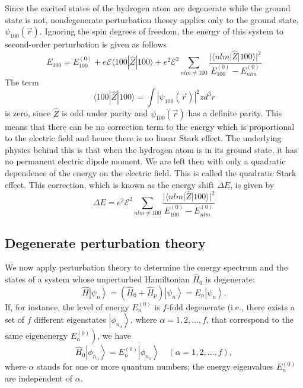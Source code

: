 Since the excited states of the hydrogen atom are degenerate while the ground state is not, nondegenerate perturbation theory applies only to the ground state, $\psi_{100}(\vec{r})$. Ignoring the spin degrees of freedom, the energy of this system to second-order perturbation is given as follows
$$
E_{100}=E_{100}^{(0)}+e \mathcal{E}\langle 100|\hat{Z}| 100\rangle+e^{2} \mathcal{E}^{2} \sum_{n l m \neq 100} \frac{|\langle n l m|\hat{Z}| 100\rangle|^{2}}{E_{100}^{(0)}-E_{n l m}^{(0)}}
$$
The term
$$
\langle 100|\hat{Z}| 100\rangle=\int\left|\psi_{100}(\vec{r})\right|^{2} z d^{3} r
$$
is zero, since $\hat{Z}$ is odd under parity and $\psi_{100}(\vec{r})$ has a definite parity. This means that there can be no correction term to the energy which is proportional to the electric field and hence there is no linear Stark effect. The underlying physics behind this is that when the hydrogen atom is in its ground state, it has no permanent electric dipole moment. We are left then with only a quadratic dependence of the energy  on the electric field. This is called the quadratic Stark effect. This correction, which is known as the energy shift $\Delta E$, is given by
$$
\Delta E=e^{2} \mathcal{E}^{2} \sum_{n l m \neq 100} \frac{|\langle n l m|\hat{Z}| 100\rangle|^{2}}{E_{100}^{(0)}-E_{n l m}^{(0)}}
$$
\subsection{Degenerate perturbation theory}
 We now apply perturbation theory to determine the energy spectrum and the states of a system whose unperturbed Hamiltonian $\hat{H}_{0}$ is degenerate:
$$
\hat{H}\left|\psi_{n}\right\rangle=\left(\hat{H}_{0}+\hat{H}_{p}\right)\left|\psi_{n}\right\rangle=E_{n}\left|\psi_{n}\right\rangle .
$$
If, for instance, the level of energy $E_{n}^{(0)}$ is $f$-fold degenerate (i.e., there exists a set of $f$ different eigenstates $\left|\phi_{n_{\alpha}}\right\rangle$, where $\alpha=1,2, \ldots, f$, that correspond to the same eigenenergy $\left.E_{n}^{(0)}\right)$, we have
$$
\hat{H}_{0}\left|\phi_{n_{\alpha}}\right\rangle=E_{n}^{(0)}\left|\phi_{n_{\alpha}}\right\rangle \quad(\alpha=1,2, \ldots, f),
$$
where $\alpha$ stands for one or more quantum numbers; the energy eigenvalues $E_{n}^{(0)}$ are independent of $\alpha$.

